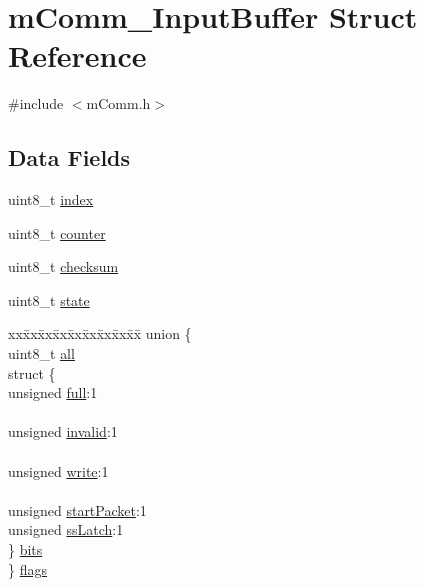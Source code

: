 \hypertarget{structm_comm___input_buffer}{}\section{m\+Comm\+\_\+\+Input\+Buffer Struct Reference}
\label{structm_comm___input_buffer}


{\ttfamily \#include $<$m\+Comm.\+h$>$}

\subsection*{Data Fields}
\begin{DoxyCompactItemize}
\item 
uint8\+\_\+t \hyperlink{structm_comm___input_buffer_aae5a12e607d0f782506d9e6ec6179c64}{index}
\item 
uint8\+\_\+t \hyperlink{structm_comm___input_buffer_a0480b812cba9c1d9c71a5fb1071bd0fc}{counter}
\item 
uint8\+\_\+t \hyperlink{structm_comm___input_buffer_a59eac9627282a484fbaf0aa7aa3b8a9a}{checksum}
\item 
uint8\+\_\+t \hyperlink{structm_comm___input_buffer_a0b57aa10271a66f3dc936bba1d2f3830}{state}
\item 
\begin{tabbing}
xx\=xx\=xx\=xx\=xx\=xx\=xx\=xx\=xx\=\kill
union \{\\
\>uint8\_t \hyperlink{structm_comm___input_buffer_af61f8246015db4f0a85a942ac747131e}{all}\\
\>struct \{\\
\>\>unsigned \hyperlink{structm_comm___input_buffer_a69e2d5ccbb19f5e4b8bc58074fca8f54}{full}:1\\
\>\>\\
\>\>unsigned \hyperlink{structm_comm___input_buffer_a066d82270b94fbd24c215e42052f8c33}{invalid}:1\\
\>\>\\
\>\>unsigned \hyperlink{structm_comm___input_buffer_a7f9bd405bd2f03dec58905c3ec5f2964}{write}:1\\
\>\>\\
\>\>unsigned \hyperlink{structm_comm___input_buffer_a54eec99f0e68e78d3ed4b064a5960cb5}{startPacket}:1\\
\>\>unsigned \hyperlink{structm_comm___input_buffer_a562a2e23a37e69c437ce24e2af6b408b}{ssLatch}:1\\
\>\} \hyperlink{structm_comm___input_buffer_a79fd6172bbc3e268bf9c6a31aed08376}{bits}\\
\} \hyperlink{structm_comm___input_buffer_ae65be2fdbb0559c8de9fb8842bd6338e}{flags}\\


\end{tabbing}
\end{DoxyCompactItemize}
